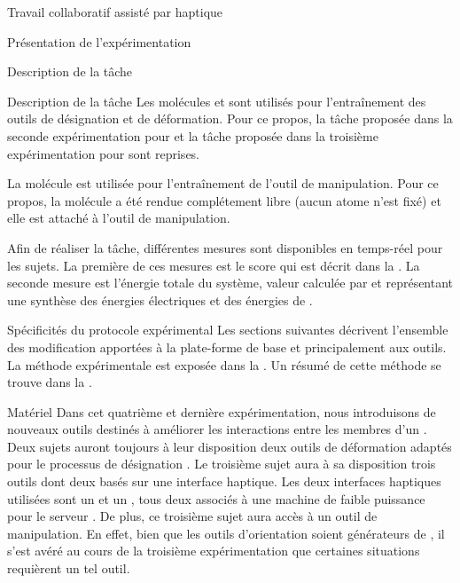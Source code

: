 \documentclass[myfrancais,ngerman,english,frenchb]{mythesis}
\begin{document}
\begin{mychapter}{Travail collaboratif assisté par haptique}
\begin{mysection}{Présentation de l'expérimentation}
\begin{mysubsection}{Description de la tâche}
\begin{mysubsubsection}{Description de la tâche}
					Les molécules \myTRPCAGE et \myPrion sont utilisés pour l'entraînement des outils de désignation et de déformation.
					Pour ce propos, la tâche proposée dans la seconde expérimentation pour \myTRPCAGE et la tâche proposée dans la troisième expérimentation pour \myPrion sont reprises.

					La molécule \myTRPZIPPER est utilisée pour l'entraînement de l'outil de manipulation.
					Pour ce propos, la molécule \myTRPZIPPER a été rendue complétement libre (aucun atome n'est fixé) et elle est attaché à l'outil de manipulation.

					Afin de réaliser la tâche, différentes mesures sont disponibles en temps-réel pour les sujets.
					La première de ces mesures est le score  qui est décrit dans la .
					La seconde mesure est l'énergie totale du système, valeur calculée par  et représentant une synthèse des énergies électriques et des énergies de .
				\end{mysubsubsection}
			\end{mysubsection}
			\begin{mysubsection}{Spécificités du protocole expérimental}
				Les sections suivantes décrivent l'ensemble des modification apportées à la plate-forme de base  et principalement aux outils.
				La méthode expérimentale est exposée dans la .
				Un résumé de cette méthode se trouve dans la .
				\begin{mysubsubsection}[sss-exp4-Materiel]{Matériel}
					Dans cet quatrième et dernière expérimentation, nous introduisons de nouveaux outils destinés à améliorer les interactions entre les membres d'un .
					Deux sujets auront toujours à leur disposition deux outils de déformation adaptés pour le processus de désignation .
					Le troisième sujet aura à sa disposition trois outils dont deux basés sur une interface haptique.
					Les deux interfaces haptiques utilisées sont un \myOmni et un \myDesktop, tous deux associés à une machine de faible puissance pour le serveur .
					De plus, ce troisième sujet aura accès à un outil de manipulation.
					En effet, bien que les outils d'orientation soient générateurs de , il s'est avéré au cours de la troisième expérimentation que certaines situations requièrent un tel outil.

\end{mysubsubsection}
\end{mysubsection}
\end{mysection}
\end{mychapter}
\end{document}
